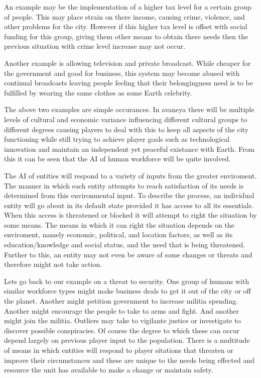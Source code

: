 An example may be the implementation of a higher tax level for a certain group of people. This may place strain on there income, causing crime, violence, and other problems for the city. However if this higher tax level is offset with social funding for this group, giving them other means to obtain there needs then the previous situation with crime level increase may not occur. 

Another example is allowing television and private broadcast. While cheaper for the government and good for business, this system may become abused with continual broadcasts leaving people feeling that their belongingness need is to be fulfilled by wearing the same clothes as some Earth celebrity. 

The above two examples are simple occurances. In avaneya there will be multiple levels of cultural and economic variance influencing different cultural groups to different degrees causing players to deal with this to keep all aspects of the city functioning while still trying to achieve player goals such as technological innovation and maintain an independent yet peaceful existance with Earth. From this it can be seen that the AI of human workforce will be quite involved.   

The AI of entities will respond to a variety of inputs from the greater enviroment. The manner in which each entity attempts to reach satisfaction of its needs is determined from this environmental input. To describe the process, an individual entity will go about in its default state provided it has access to all its essentials. When this access is threatened or blocked it will attempt to right the situation by some means. The means in which it can right the situation depends on the enviroment, namely economic, political, and location factors, as well as its education/knowledge and social status, and the need that is being threatened. Further to this, an entity may not even be aware of some changes or threats and therefore might not take action.

Lets go back to our example on a threat to security. One group of humans with similar workforce types might make business deals to get it out of the city or off the planet. Another might petition government to increase militia spending. Another might encourage the people to take to arms and fight. And another might join the militia. Outliers may take to vigilante justice or investigate to discover possible conspiracies. Of course the degree to which these can occur depend largely on previous player input to the population. There is a multitude of means in which entities will respond to player sitations that threaten or improve their circumstances and these are unique to the needs being effected and resource the unit has available to make a change or maintain safety.

